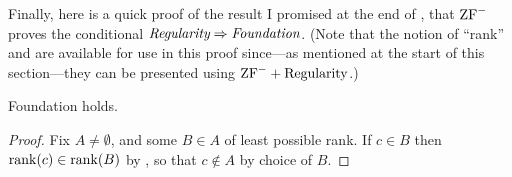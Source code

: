 \documentclass[../../../include/open-logic-section]{subfiles}
\begin{document}
Finally, here is a quick proof of the result I promised at the end of
, that $\mathrm{ZF}^{-}$ proves the conditional
$\emph{Regularity} \Rightarrow \emph{Foundation}$. (Note that the
notion of ``rank'' and  are available for use
in this proof since---as mentioned at the start of this section---they
can be presented using $\mathrm{ZF}^{-} + \text{Regularity}$.)

\begin{prop} Foundation holds.
\end{prop}

\begin{proof}
Fix $A \neq \emptyset$, and some $B \in A$ of least possible rank. If
$c \in B$ then $\mathrm{rank}(c) \in \mathrm{rank}(B)$ by
, so that $c \notin A$ by choice of $B$.
\end{proof}
\end{document}
